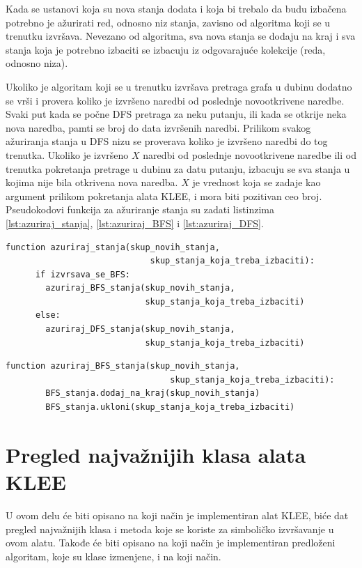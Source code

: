 \documentclass[12pt,oneside]{memoir}
\begin{document}
Kada se ustanovi koja su nova stanja dodata i koja bi trebalo da budu izbačena potrebno je ažurirati red, odnosno niz stanja, zavisno od algoritma koji se u trenutku izvršava. Nevezano od algoritma, sva nova stanja se dodaju na kraj i sva stanja koja je potrebno izbaciti se izbacuju iz odgovarajuće kolekcije (reda, odnosno niza). 

Ukoliko je algoritam koji se u trenutku izvršava pretraga grafa u dubinu dodatno se vrši i provera koliko je izvršeno naredbi od poslednje novootkrivene naredbe. Svaki put kada se počne DFS pretraga za neku putanju, ili kada se otkrije neka nova naredba, pamti se broj do data izvršenih naredbi. Prilikom svakog ažuriranja stanja u DFS nizu se proverava koliko je izvršeno naredbi do tog trenutka. Ukoliko je izvršeno $X$ naredbi od poslednje novootkrivene naredbe ili od trenutka pokretanja pretrage u dubinu za datu putanju, izbacuju se sva stanja u kojima nije bila otkrivena nova naredba. $X$ je vrednost koja se zadaje kao argument prilikom pokretanja alata KLEE, i mora biti pozitivan ceo broj. Pseudokodovi funkcija za ažuriranje stanja su zadati listinzima \ref{lst:azuriraj_stanja}, \ref{lst:azuriraj_BFS} i \ref{lst:azuriraj_DFS}.

    \begin{lstlisting}[caption={Pseudok\^od funkcije za ažuriranje stanja},captionpos=b,label={lst:azuriraj_stanja}]
    function azuriraj_stanja(skup_novih_stanja, 
                             skup_stanja_koja_treba_izbaciti):
      if izvrsava_se_BFS:
        azuriraj_BFS_stanja(skup_novih_stanja, 
                            skup_stanja_koja_treba_izbaciti)
      else:
        azuriraj_DFS_stanja(skup_novih_stanja, 
                            skup_stanja_koja_treba_izbaciti)
    \end{lstlisting}
    
    \begin{lstlisting}[caption={Pseudok\^od funkcije za ažuriranje BFS stanja},captionpos=b,label={lst:azuriraj_BFS}]
    function azuriraj_BFS_stanja(skup_novih_stanja, 
                                 skup_stanja_koja_treba_izbaciti):
        BFS_stanja.dodaj_na_kraj(skup_novih_stanja)
        BFS_stanja.ukloni(skup_stanja_koja_treba_izbaciti)
    \end{lstlisting}
    
\section{Pregled najvažnijih klasa alata KLEE}
U ovom delu će biti opisano na koji način je implementiran alat KLEE, biće dat pregled najvažnijih klasa i metoda koje se koriste za simboličko izvršavanje u ovom alatu. Takođe će biti opisano na koji način je implementiran predloženi algoritam, koje su klase izmenjene, i na koji način.
\end{document}
